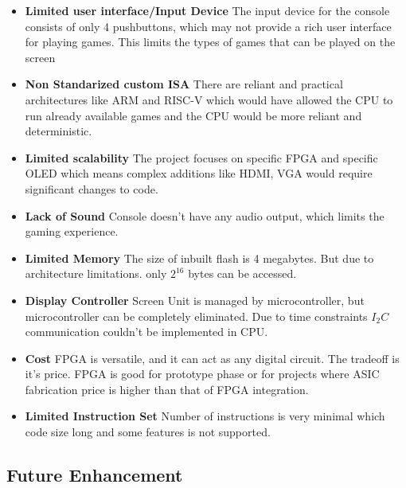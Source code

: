 \documentclass[a4paper,12pt]{article}
\begin{document}
    \begin{itemize}
        \item \textbf{Limited user interface/Input Device} The input device for the console consists of only 4 pushbuttons, which may not provide a rich user interface for playing games. This limits the types of games that can be played on the screen 
        \item \textbf{Non Standarized custom ISA} There are reliant and practical architectures like ARM and RISC-V which would have allowed the CPU to run already available games and the CPU would be more reliant and deterministic. 
        \item \textbf{Limited scalability} The project focuses on specific FPGA and specific OLED which means complex additions like HDMI, VGA would require significant changes to code.
        \item \textbf{Lack of Sound} Console doesn't have any audio output, which limits the gaming experience. 
        \item \textbf{Limited Memory} The size of inbuilt flash is 4 megabytes. But due to architecture limitations. only $2^{16}$ bytes can be accessed.
        \item \textbf{Display Controller} Screen Unit is managed by microcontroller, but microcontroller can be completely eliminated. Due to time constraints $I_2C$ communication couldn't be implemented in CPU. 
        \item \textbf{Cost} FPGA is versatile, and it can act as any digital circuit. The tradeoff is it's price. FPGA is good for prototype phase or for projects where ASIC fabrication price is higher than that of FPGA integration.
        \item \textbf{Limited Instruction Set} Number of instructions is very minimal which code size long and some features is not supported. 
    \end{itemize}

    
    \subsection{Future Enhancement}
\end{document}

